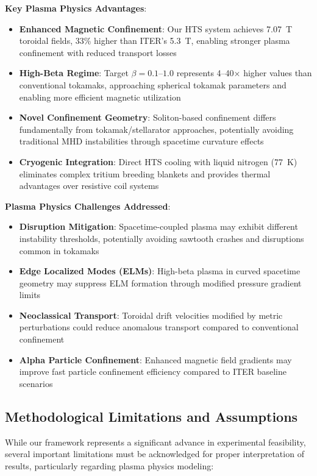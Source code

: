 \documentclass[12pt,a4paper]{article}
\begin{document}
\textbf{Key Plasma Physics Advantages}:
\begin{itemize}
\item \textbf{Enhanced Magnetic Confinement}: Our HTS system achieves 7.07~T toroidal fields, 33\% higher than ITER's 5.3~T, enabling stronger plasma confinement with reduced transport losses
\item \textbf{High-Beta Regime}: Target $\beta = 0.1$--$1.0$ represents 4--40× higher values than conventional tokamaks, approaching spherical tokamak parameters and enabling more efficient magnetic utilization
\item \textbf{Novel Confinement Geometry}: Soliton-based confinement differs fundamentally from tokamak/stellarator approaches, potentially avoiding traditional MHD instabilities through spacetime curvature effects
\item \textbf{Cryogenic Integration}: Direct HTS cooling with liquid nitrogen (77~K) eliminates complex tritium breeding blankets and provides thermal advantages over resistive coil systems
\end{itemize}

\textbf{Plasma Physics Challenges Addressed}:
\begin{itemize}
\item \textbf{Disruption Mitigation}: Spacetime-coupled plasma may exhibit different instability thresholds, potentially avoiding sawtooth crashes and disruptions common in tokamaks
\item \textbf{Edge Localized Modes (ELMs)}: High-beta plasma in curved spacetime geometry may suppress ELM formation through modified pressure gradient limits
\item \textbf{Neoclassical Transport}: Toroidal drift velocities modified by metric perturbations could reduce anomalous transport compared to conventional confinement
\item \textbf{Alpha Particle Confinement}: Enhanced magnetic field gradients may improve fast particle confinement efficiency compared to ITER baseline scenarios
\end{itemize}

\subsection{Methodological Limitations and Assumptions}

While our framework represents a significant advance in experimental feasibility, several important limitations must be acknowledged for proper interpretation of results, particularly regarding plasma physics modeling:
\end{document}
